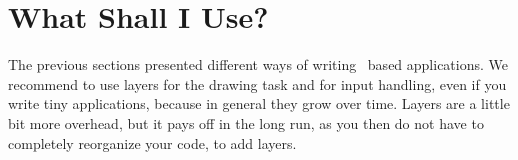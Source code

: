 \section{What Shall I Use?}

The previous sections presented different ways of writing \qt\ based 
applications. We recommend to use layers for the drawing task and for
input handling, even if you write tiny applications, because in general
they grow over time. Layers are a little bit more overhead, but 
it pays off in the long run, as you then do not have to completely
reorganize your code, to add layers. 








